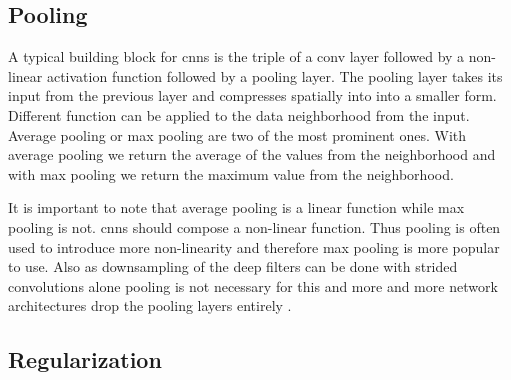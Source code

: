 \subsection{Pooling}
\label{sub:concepts:nn:pooling}
A typical building block for \glspl{cnn} is the triple of a \gls{conv} layer followed by a non-linear activation function followed by a pooling layer. The pooling layer takes its input from the previous layer and compresses spatially into into a smaller form. Different function can be applied to the data neighborhood from the input. Average pooling \citep{lecun_handwritten_1990} or max pooling \citep{zhou_computation_1988} are two of the most prominent ones. With average pooling we return the average of the values from the neighborhood and with max pooling we return the maximum value from the neighborhood.

It is important to note that average pooling is a linear function while max pooling is not. \glspl{cnn} should compose a non-linear function. Thus pooling is often used to introduce more non-linearity and therefore max pooling is more popular to use. Also as downsampling of the deep filters can be done with strided convolutions alone pooling is not necessary for this and more and more network architectures drop the pooling layers entirely \citep{springenberg_striving_2014}.

\subsection{Regularization} %
\label{sub:conepts:nn:regularization}


